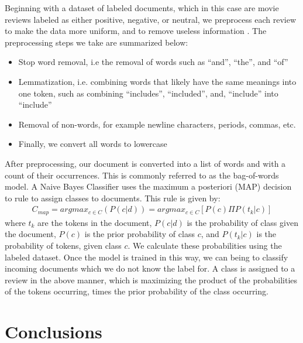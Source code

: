 \documentclass[a0,portrait]{a0poster}
\begin{document}
\begin{multicols}{2}
Beginning with a dataset of labeled documents, which in this case are movie reviews labeled as either positive, negative, or neutral, we preprocess each review to make the data more uniform, and to remove useless information \cite{bird_natural_2009}. The preprocessing steps we take are summarized below:
\newline
\begin{itemize}
\item Stop word removal, i.e the removal of words such as “and”,  “the”, and “of”
\item Lemmatization, i.e. combining words that likely have the same meanings into one token, such as combining “includes”, “included”, and, “include” into “include”
\item Removal of non-words, for example newline characters, periods, commas, etc.
\item Finally, we convert all words to lowercase
\end{itemize}
\leavevmode
\newline
After preprocessing, our document is converted into a list of words and with a count of their occurrences. This is commonly referred to as the bag-of-words model. 
\newline
\newline
A Naive Bayes Classifier uses the maximum a posteriori (MAP) decision to rule to assign classes to documents. This rule is given by:
\begin{eqnarray}
C_{map} = argmax_{c\in C} (P(c|d)) = argmax_{c\in C}[P(c)\Pi P(t_k |c)]
\label{eqn:Equation 1}
\end{eqnarray}
where \(t_k\) are the tokens in the document, \(P(c|d)\) is the probability of class given the document, \(P(c)\) is the prior probability of class \(c\), and \(P(t_k|c)\) is the probability of tokens, given class \(c\). We calculate these probabilities using the labeled dataset. 
\leavevmode
Once the model is trained in this way, we can being to classify incoming documents which we do not know the label for. A class is assigned to a review in the above manner, which is maximizing the product of the probabilities of the tokens occurring, times the prior probability of the class occurring.  
\newline

\section*{Conclusions}


\end{multicols}
\end{document}
